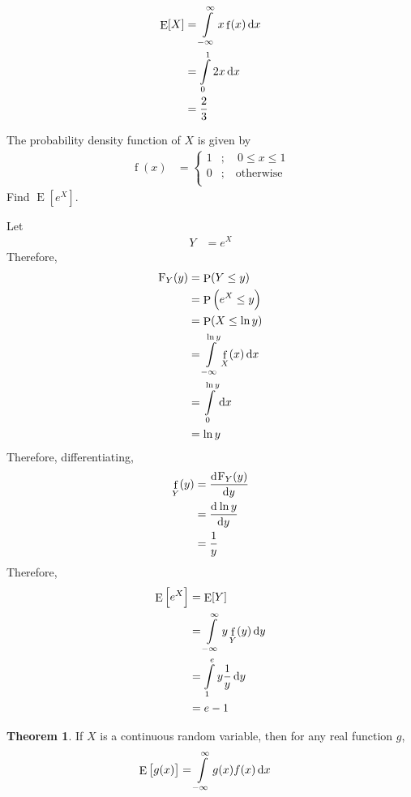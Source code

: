 \documentclass[titlepage, fleqn, a4paper, 12pt, twoside]{article}
\theoremstyle{definition}
\theoremstyle{theorem}
\newtheorem{theorem}{Theorem}
\DeclareMathOperator{\prob}{\mathrm{P}}
\DeclareMathOperator{\expct}{\mathrm{E}}
\DeclareMathOperator{\pdf}{\mathrm{f}}
\newcommand*{\cdf}[1]{\mathrm{F}_{#1}}
\begin{document}
\begin{solution}
	\begin{align*}
		\expct[X] &= \int\limits_{-\infty}^{\infty} x \pdf(x) \dif x\\
		&= \int\limits_{0}^{1} 2 x \dif x\\
		&= \frac{2}{3}
	\end{align*}
\end{solution}

\begin{question}
	The probability density function of $X$ is given by
	\begin{align*}
		\pdf(x) &=
			\begin{cases}
				1 &;\quad 0 \le x \le 1\\
				0 &;\quad \text{otherwise}\\
			\end{cases}
	\end{align*}
	Find $\expct\left[ e^X \right]$.
\end{question}

\begin{solution}
	Let
	\begin{align*}
		Y &= e^X
	\end{align*}
	Therefore,
	\begin{align*}
		\cdf{Y}(y) &= \prob(Y \le y)\\
		&= \prob\left( e^X \le y \right)\\
		&= \prob(X \le \ln y)\\
		&= \int\limits_{-\infty}^{\ln y} \pdf_X(x) \dif x\\
		&= \int\limits_{0}^{\ln y} \dif x\\
		&= \ln y
	\end{align*}
	Therefore, differentiating,
	\begin{align*}
		\pdf_Y(y) &= \dod{\cdf{Y}(y)}{y}\\
		&= \dod{\ln y}{y}\\
		&= \frac{1}{y}
	\end{align*}
	Therefore,
	\begin{align*}
		\expct\left[ e^X \right] &= \expct[Y]\\
		&= \int\limits_{-\infty}^{\infty} y \pdf_Y(y) \dif y\\
		&= \int\limits_{1}^{e} y \frac{1}{y} \dif y\\
		&= e - 1
	\end{align*}
\end{solution}

\begin{theorem}
	If $X$ is a continuous random variable, then for any real function $g$,
	\begin{align*}
		\expct\left[ g(x) \right] &= \int\limits_{-\infty}^{\infty} g(x) f(x) \dif x
	\end{align*}
\end{theorem}
\end{document}
